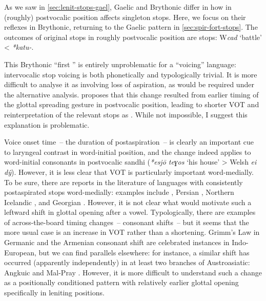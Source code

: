 \documentclass[output=paper,colorlinks,citecolor=brown]{langscibook}
\begin{document}
As we saw in \cref{sec:lenit-stops-gael}, Gaelic and Brythonic differ in how  in (roughly) postvocalic position affects singleton  stops. Here, we focus on their reflexes in Brythonic, returning to the Gaelic pattern in \cref{sec:spir-fort-stops}. The outcomes of original  stops in roughly postvocalic position are  stops:  W\textit{cad} `battle' < \textit{*katu-}. 

This Brythonic \enquote{first } is entirely unproblematic for a \enquote{voicing} language: intervocalic stop voicing is both phonetically and typologically trivial. It is more difficult to analyse it as involving loss of aspiration, as would be required under the alternative analysis. \Textcite{eska2020interarticulatory} proposes that this change resulted from earlier timing of the glottal spreading gesture in postvocalic position, leading to shorter VOT and reinterpretation of the relevant stops as . While not impossible, I suggest this explanation is problematic.

Voice onset time~-- the duration of postaspiration~-- is clearly an important cue to laryngeal contrast in word\hyp initial position, and the change indeed applies to word\hyp initial consonants in postvocalic sandhi (\textit{*esjō teɣos} `his house' > Welsh \textit{ei dŷ}). However, it is less clear that VOT is particularly important word\hyp medially. To be sure, there are reports in the literature of languages with consistently postaspirated  stops word\hyp medially: examples include  \parencite{jessen1998phonetics}, Persian \parencite{bijankhan2009voice}, Northern Icelandic \parencite{helgason}, and Georgian \parencite{Vicenik2010}. However, it is not clear what would motivate such a leftward shift in glottal opening after a vowel. Typologically, there are examples of across\hyp the\hyp board timing changes~-- consonant shifts~-- but it seems that the more usual case is an increase in VOT rather than a shortening. Grimm's Law in Germanic and the Armenian consonant shift \parencite[e.\,g.][]{sayeed2017armenian} are celebrated instances in Indo\hyp European, but we can find parallels elsewhere: for instance, a similar shift has occurred (apparently independently) in at least two branches of Austroasiatic: Angkuic and Mal-Pray \parencite{sidwell2021northern}. However, it is more difficult to understand such a change as a positionally conditioned pattern with relatively earlier glottal opening specifically in leniting positions.
\end{document}
